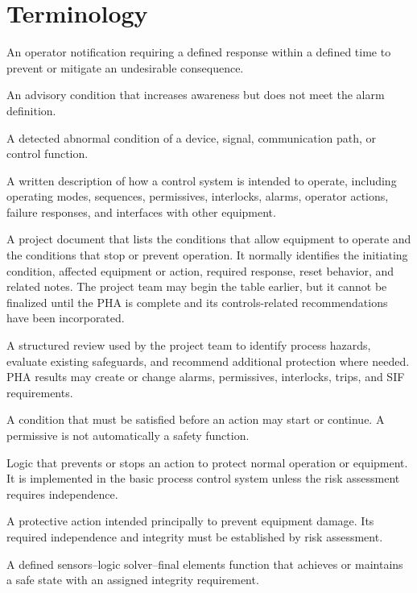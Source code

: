 \chapter{Terminology}
\begin{description}[style=nextline,leftmargin=0pt]
  \item[Alarm] An operator notification requiring a defined response within a defined time to prevent or mitigate an undesirable consequence.
  \item[Warning] An advisory condition that increases awareness but does not meet the alarm definition.
  \item[Fault] A detected abnormal condition of a device, signal, communication path, or control function.
  \item[Control narrative] A written description of how a control system is intended to operate, including operating modes, sequences, permissives, interlocks, alarms, operator actions, failure responses, and interfaces with other equipment.
  \item[Table of Interlocks and Permissives] A project document that lists the conditions that allow equipment to operate and the conditions that stop or prevent operation. It normally identifies the initiating condition, affected equipment or action, required response, reset behavior, and related notes. The project team may begin the table earlier, but it cannot be finalized until the PHA is complete and its controls-related recommendations have been incorporated.
  \item[Process Hazard Analysis (PHA)] A structured review used by the project team to identify process hazards, evaluate existing safeguards, and recommend additional protection where needed. PHA results may create or change alarms, permissives, interlocks, trips, and SIF requirements.
  \item[Permissive] A condition that must be satisfied before an action may start or continue. A permissive is not automatically a safety function.
  \item[Control interlock] Logic that prevents or stops an action to protect normal operation or equipment. It is implemented in the basic process control system unless the risk assessment requires independence.
  \item[Equipment protective interlock] A protective action intended principally to prevent equipment damage. Its required independence and integrity must be established by risk assessment.
  \item[Safety instrumented function (SIF)] A defined sensors--logic solver--final elements function that achieves or maintains a safe state with an assigned integrity requirement.

\end{description}
